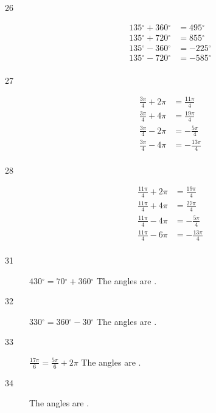 \documentclass{exam}
\newcommand{\degree}{\ensuremath{^\circ}}
\begin{document}
\begin{description}
      \item[26] 
        \begin{align*}
          135 \degree + 360 \degree & = \boxed{ 495 \degree } \\
          135 \degree + 720 \degree & = \boxed{ 855 \degree } \\
          135 \degree - 360 \degree & = \boxed{ -225 \degree } \\
          135 \degree - 720 \degree & = \boxed{ -585 \degree } \\
        \end{align*}

      \item[27] 
        \begin{align*}
          \frac{3 \pi}{4} + 2 \pi & = \boxed{ \frac{11 \pi}{4} } \\
          \frac{3 \pi}{4} + 4 \pi & = \boxed{ \frac{19 \pi}{4} } \\
          \frac{3 \pi}{4} - 2 \pi & = \boxed{ - \frac{5 \pi}{4} } \\
          \frac{3 \pi}{4} - 4 \pi & = \boxed{ - \frac{13 \pi}{4} } \\
        \end{align*}

      \item[28] 
        \begin{align*}
          \frac{11 \pi}{4} + 2 \pi & = \boxed{ \frac{19 \pi}{4} } \\
          \frac{11 \pi}{4} + 4 \pi & = \boxed{ \frac{27 \pi}{4} } \\
          \frac{11 \pi}{4} - 4 \pi & = \boxed{ - \frac{5 \pi}{4} } \\
          \frac{11 \pi}{4} - 6 \pi & = \boxed{ - \frac{13 \pi}{4} } \\
        \end{align*}

      \item[31] $430 \degree = 70 \degree + 360 \degree$
        The angles are .

      \item[32] $330 \degree = 360 \degree - 30 \degree$
        The angles are .

      \item[33] $\frac{17 \pi}{6} = \frac{5 \pi}{6} + 2 \pi$
        The angles are .

      \item[34] The angles are .


\end{description}
\end{document}
